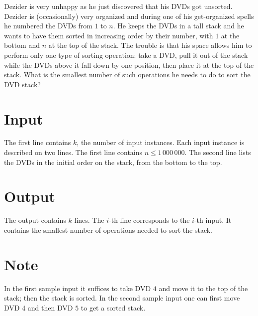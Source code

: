 
Dezider is very unhappy as he just discovered that his DVDs got unsorted. Dezider is (occasionally) very organized and during one of his get-organized spells he numbered the DVDs from $1$ to $n$. He keeps the DVDs in a tall stack and he wants to have them sorted in increasing order  by their number, with $1$ at the bottom and $n$ at the top of the stack. The trouble is that his space allows him to perform only one type of sorting operation: take a DVD, pull it out of the stack while the DVDs above it fall down by one position, then place it at the top of the stack. What is the smallest number of such operations he needs to do to sort the DVD stack?

\section*{Input}
The first line contains $k$, the number of input instances. Each input instance is described on two
lines. The first line contains $n\leq 1\,000\,000$. The second line lists the DVDs in the initial
order on the stack, from the bottom to the top.

\section*{Output}
The output contains $k$ lines. The $i$-th line corresponds to the $i$-th input.
It contains the smallest number of operations needed to sort the stack.

\section*{Note}
In the first sample input it suffices to take DVD $4$ and move it to the top of the stack; then the stack is sorted.
In the second sample input one can first move DVD $4$ and then DVD $5$ to get a sorted stack.
